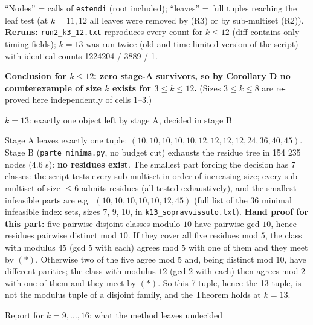 \documentclass[11pt,a4paper]{article}
\begin{document}
``Nodes'' = calls of \texttt{estendi} (root included); ``leaves'' = full
tuples reaching the leaf test (at \(k=11,12\) all leaves were removed by
(R3) or by sub-multiset (R2)). \textbf{Reruns:}
\texttt{run2\_k3\_12.txt} reproduces every count for \(k\le12\) (diff
contains only timing fields); \(k=13\) was run twice (old and
time-limited version of the script) with identical counts 1224204 / 3889
/ 1.

\textbf{Conclusion for \(k\le12\): zero stage-A survivors, so by
Corollary D no counterexample of size \(k\) exists for \(3\le k\le12\).}
(Sizes \(3\le k\le8\) are re-proved here independently of cells 1--3.)

\(k=13\): exactly one object left by stage A, decided in stage B

Stage A leaves exactly one tuple:
\((10,10,10,10,10,12,12,12,12,24,36,40,45)\). Stage B
(\texttt{parte\_minima.py}, no budget cut) exhausts the residue tree in
154 235 nodes (4.6 s): \textbf{no residues exist}. The smallest part
forcing the decision has 7 classes: the script tests every sub-multiset
in order of increasing size; every sub-multiset of size \(\le6\) admits
residues (all tested exhaustively), and the smallest infeasible parts
are e.g.~\((10,10,10,10,10,12,45)\) (full list of the 36 minimal
infeasible index sets, sizes 7, 9, 10, in
\texttt{k13\_sopravvissuto.txt}). \textbf{Hand proof for this part:}
five pairwise disjoint classes modulo \(10\) have pairwise gcd \(10\),
hence residues pairwise distinct mod \(10\). If they cover all five
residues mod \(5\), the class with modulus \(45\) (gcd \(5\) with each)
agrees mod \(5\) with one of them and they meet by \((*)\). Otherwise
two of the five agree mod \(5\) and, being distinct mod \(10\), have
different parities; the class with modulus \(12\) (gcd \(2\) with each)
then agrees mod \(2\) with one of them and they meet by \((*)\). So this
7-tuple, hence the 13-tuple, is not the modulus tuple of a disjoint
family, and the Theorem holds at \(k=13\).

Report for \(k=9,\dots,16\): what the method leaves undecided
\end{document}
